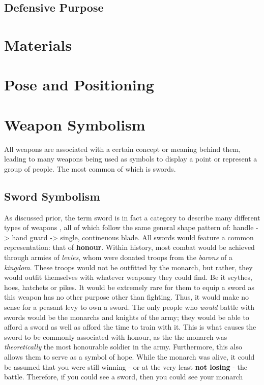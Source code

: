 \documentclass{article}
\begin{document}
\subsection{Defensive Purpose}

\pagebreak

\section{Materials}

\pagebreak
\section{Pose and Positioning}



\pagebreak

\section{Weapon Symbolism}
All weapons are associated with a certain concept or meaning behind them, leading to many weapons being used as symbols to display a point or represent a group of people. The most common of which is swords.
\subsection{Sword Symbolism}
As discussed prior, the term sword is in fact a category to describe many different types of weapons \parencite{furat1998brief}, all of which follow the same general shape pattern of: handle -> hand guard -> single, contineuous blade.
All swords would feature a common representation: that of \textbf{honour}. Within history, most combat would be achieved through armies of \textit{levies}, whom were donated troops from the \textit{barons} of a \textit{kingdom}. These troops would not be outfitted by the monarch, but rather, they would outfit themselves with whatever weaponry they could find. Be it scythes, hoes, hatchets or pikes. It would be extremely rare for them to equip a sword as this weapon has no other purpose other than fighting. Thus, it would make no sense for a peasant levy to own a sword. The only people who \textit{would} battle with swords would be the monarchs and knights of the army; they would be able to afford a sword as well as afford the time to train with it. This is what causes the sword to be commonly associated with honour, as the the monarch was \textit{theoretically} the most honourable soldier in the army. Furthermore, this also allows them to serve as a symbol of hope. While the monarch was alive, it could be assumed that you were still winning - or at the very least \textbf{not losing} - the battle. Therefore, if you could see a sword, then you could see your monarch
\end{document}
